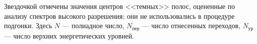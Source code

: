 \begin{flushleft}\footnotesize
Звездочкой отмечены значения центров <<темных>> полос, оцененные по анализу спектров высокого разрешения; они не использовались в процедуре подгонки. Здесь $N$ --- полиадное число, $N_{\textrm{пер}}$ --- число отнесенных переходов, $N_{\textrm{ур}}$ --- число верхних энергетических уровней.
\end{flushleft}
\endgroup
